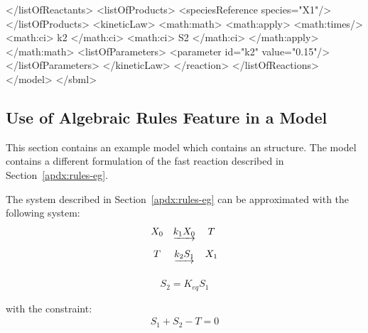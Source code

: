 \documentclass[10pt,twocolumntoc]{cekarticle}
\begin{document}
\begin{example}
                </listOfReactants>
                <listOfProducts>
                    <speciesReference species="X1"/>
                </listOfProducts>
                <kineticLaw>
                    <math:math>
                        <math:apply>
                            <math:times/>
                            <math:ci> k2 </math:ci>
                            <math:ci> S2 </math:ci>
                        </math:apply>
                    </math:math>
                    <listOfParameters>
                        <parameter id="k2" value="0.15"/>
                    </listOfParameters>
                </kineticLaw>
            </reaction>
        </listOfReactions>
    </model>
</sbml>
\end{example}

\subsection{Use of Algebraic Rules Feature in a Model}
\label{sec:algeraiceg}

This section contains an example model which contains an
 structure.  The model contains a different
formulation of the fast reaction described in
Section~\ref{apdx:rules-eg}.

The system described in Section~\ref{apdx:rules-eg} can be
approximated with the following system:
\begin{equation*}
  \begin{array}{@{}ccc@{}}
    X_0 & \underrightarrow{k_1 X_0} & T \\ \\[-4pt]
    T & \underrightarrow{k_2 S_1} & X_1\\ \\[-4pt]
  \end{array}
\end{equation*}
\begin{equation*}
  \begin{array}{ll}
    S_2 = K_{eq} S_1\\ \\[-4pt]
  \end{array}
\end{equation*}
with the constraint:
\begin{equation*}
  \begin{array}{ll}
    S_1 + S_2 - T = 0\\ \\[-4pt]
  \end{array}
\end{equation*}
\end{document}
